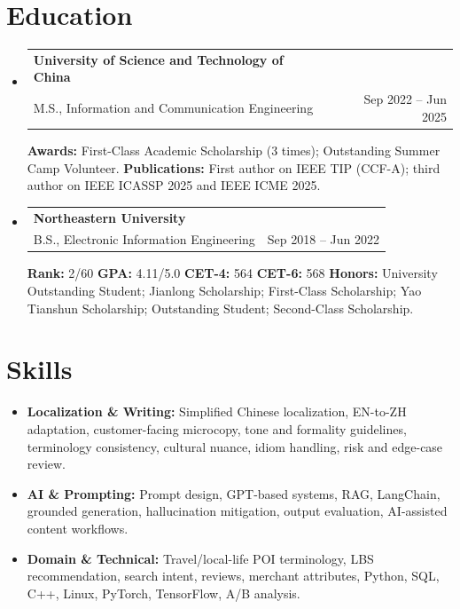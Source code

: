 \documentclass[a4paper,10pt]{article}
\makeatletter
\newcommand{\resumeSubheading}[4]{
  \vspace{2pt}\item
    \begin{tabular*}{0.97\textwidth}{l@{\extracolsep{\fill}}r}
      {\fontsize{9.8pt}{10.2pt}\selectfont\textbf{#1}} & #2 \\
      {#3} & {#4} \\
    \end{tabular*}\vspace{-1pt}
}
\newcommand{\resumeSubHeadingListStart}{\begin{itemize}[leftmargin=*]}
\newcommand{\resumeSubHeadingListEnd}{\end{itemize}}
\makeatother
\begin{document}
\vspace{-1pt}
\section{Education}
\vspace{-6pt}
  \resumeSubHeadingListStart
    \resumeSubheading
      {University of Science and Technology of China}{}{M.S., Information and Communication Engineering}{Sep 2022 -- Jun 2025}
      \vspace{-1pt}
      {\newline{}\textbf{Awards:} First-Class Academic Scholarship (3 times); Outstanding Summer Camp Volunteer.}
      \vspace{3pt}
      {\newline{}\textbf{Publications:} First author on IEEE TIP (CCF-A); third author on IEEE ICASSP 2025 and IEEE ICME 2025.}
      \resumeSubheading
      {Northeastern University}{}
      {B.S., Electronic Information Engineering}{Sep 2018 -- Jun 2022}
      \vspace{-1pt}
      {\newline{}\textbf{Rank:} 2/60 \hspace{1.7cm} \textbf{GPA:} 4.11/5.0 \hspace{1.7cm} \textbf{CET-4:} 564 \hspace{1.7cm} \textbf{CET-6:} 568}
      \vspace{0pt}
      {\newline{}\textbf{Honors:} University Outstanding Student; Jianlong Scholarship; First-Class Scholarship; Yao Tianshun Scholarship; Outstanding Student; Second-Class Scholarship.}
    \resumeSubHeadingListEnd

\vspace{-1pt}
\section{Skills}
\begin{itemize}[leftmargin=*, itemsep=3pt, topsep=-1pt]
\item \textbf{Localization \& Writing:} Simplified Chinese localization, EN-to-ZH adaptation, customer-facing microcopy, tone and formality guidelines, terminology consistency, cultural nuance, idiom handling, risk and edge-case review.
\item \textbf{AI \& Prompting:} Prompt design, GPT-based systems, RAG, LangChain, grounded generation, hallucination mitigation, output evaluation, AI-assisted content workflows.
\item \textbf{Domain \& Technical:} Travel/local-life POI terminology, LBS recommendation, search intent, reviews, merchant attributes, Python, SQL, C++, Linux, PyTorch, TensorFlow, A/B analysis.
\end{itemize}
\end{document}
